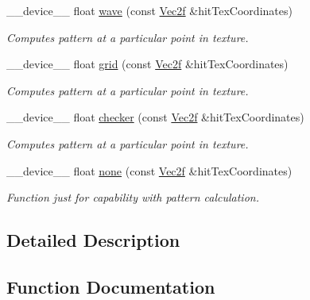 \begin{DoxyCompactItemize}
\+\_\+\+\_\+device\+\_\+\+\_\+ float \hyperlink{group__intersection__test__prperties_gaff97add1678535636b1f4f1ca3f7a96c}{wave} (const \hyperlink{class_vec2}{Vec2f} \&hit\+Tex\+Coordinates)
\begin{DoxyCompactList}\small\item\em Computes pattern at a particular point in texture. \end{DoxyCompactList}\item 
\+\_\+\+\_\+device\+\_\+\+\_\+ float \hyperlink{group__intersection__test__prperties_ga4db329f1c6b211cd0ac9e6dc297f279e}{grid} (const \hyperlink{class_vec2}{Vec2f} \&hit\+Tex\+Coordinates)
\begin{DoxyCompactList}\small\item\em Computes pattern at a particular point in texture. \end{DoxyCompactList}\item 
\+\_\+\+\_\+device\+\_\+\+\_\+ float \hyperlink{group__intersection__test__prperties_ga100df37360dfe6954f51431bc6343dc6}{checker} (const \hyperlink{class_vec2}{Vec2f} \&hit\+Tex\+Coordinates)
\begin{DoxyCompactList}\small\item\em Computes pattern at a particular point in texture. \end{DoxyCompactList}\item 
\+\_\+\+\_\+device\+\_\+\+\_\+ float \hyperlink{group__intersection__test__prperties_ga6ea9f9e6624268a263962a17c6634feb}{none} (const \hyperlink{class_vec2}{Vec2f} \&hit\+Tex\+Coordinates)
\begin{DoxyCompactList}\small\item\em Function just for capability with pattern calculation. \end{DoxyCompactList}\end{DoxyCompactItemize}


\subsection{Detailed Description}


\subsection{Function Documentation}
